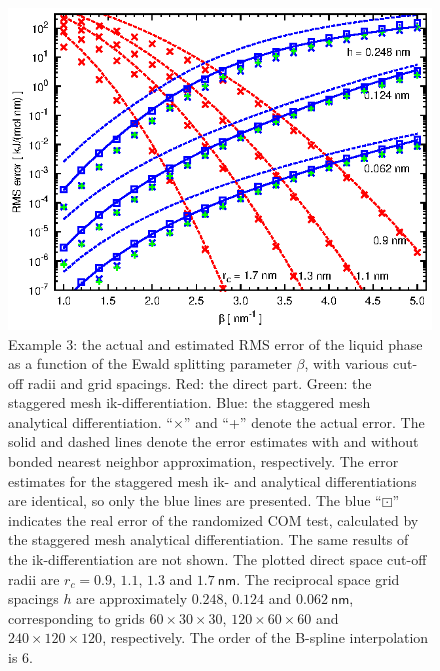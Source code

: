 \documentclass[aps,pre,preprint,unsortedaddress]{revtex4}
\begin{document}
\begin{figure}
  \centering
  \includegraphics[]{fig.mesh.st.eps}
  \caption{Example 3: the actual and estimated RMS error of the liquid
    phase as a function of the Ewald splitting parameter $\beta$,
    with various cut-off radii and grid spacings.
    Red: the direct part. Green: the staggered mesh ik-differentiation.
    Blue: the staggered mesh analytical differentiation. ``$\times$'' and
    ``+'' denote the actual error.  The solid and dashed lines denote
    the error estimates with and without bonded nearest neighbor
    approximation, respectively.
    The error estimates for the staggered mesh ik- and analytical
    differentiations are identical, so only the blue lines are presented.
    The blue ``$\boxdot$'' indicates the real error of the randomized COM test,
    calculated by the
    staggered mesh analytical differentiation. The same results
    of the ik-differentiation are not shown.
    The plotted direct space cut-off radii are
    $r_c = 0.9$, $1.1$, $1.3$ and  $1.7\:\textsf{nm}$. The
    reciprocal space grid spacings $h$  are approximately
    $0.248$, $0.124$ and $0.062\:\textsf{nm}$, corresponding to
    grids $60\times 30\times 30$, $120\times 60\times 60$ and
    $240\times 120\times 120$, respectively. The order of the B-spline
    interpolation is 6.
  }
  \label{fig:tmp-add3}
\end{figure}
\end{document}
